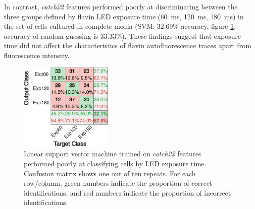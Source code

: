 In contrast, \emph{catch22} features performed poorly at discriminating between the three groups defined by flavin LED exposure time (\SI{60}{\milli\second}, \SI{120}{\milli\second}, \SI{180}{\milli\second}) in the set of cells cultured in complete media (SVM: 32.69\% accuracy, figure \ref{fig:FlavinExpostestCM}; accuracy of random guessing is 33.33\%).
These findings suggest that exposure time did not affect the characteristics of flavin autofluorescence traces apart from fluorescence intensity.

\begin{figure}[htbp]
  \centering
  \includegraphics[width=0.4\textwidth]{10m_FlavinExpostestCM}
  \caption{Linear support vector machine trained on \emph{catch22} features performed poorly at classifying cells by LED exposure time.
    Confusion matrix shows one out of ten repeats.
    For each row/column, green numbers indicate the proportion of correct identifications, and red numbers indicate the proportion of incorrect identifications.}
  \label{fig:FlavinExpostestCM}
\end{figure}


